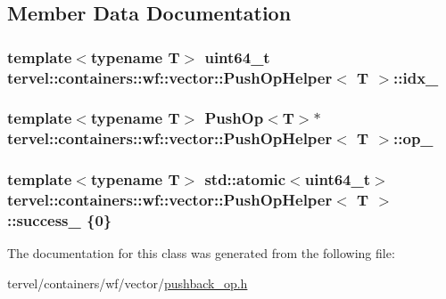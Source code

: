 \subsection{Member Data Documentation}
\hypertarget{classtervel_1_1containers_1_1wf_1_1vector_1_1_push_op_helper_a8c2d10cc9b73cbc5ccabac7e12b9f325}{}
\subsubsection[{idx\+\_\+}]{\setlength{\rightskip}{0pt plus 5cm}template$<$typename T$>$ uint64\+\_\+t {\bf tervel\+::containers\+::wf\+::vector\+::\+Push\+Op\+Helper}$<$ T $>$\+::idx\+\_\+\hspace{0.3cm}{\ttfamily [private]}}\label{classtervel_1_1containers_1_1wf_1_1vector_1_1_push_op_helper_a8c2d10cc9b73cbc5ccabac7e12b9f325}
\hypertarget{classtervel_1_1containers_1_1wf_1_1vector_1_1_push_op_helper_ac6c7fb6c7872217ddfbf83d83b426ecd}{}
\subsubsection[{op\+\_\+}]{\setlength{\rightskip}{0pt plus 5cm}template$<$typename T$>$ {\bf Push\+Op}$<$T$>$$\ast$ {\bf tervel\+::containers\+::wf\+::vector\+::\+Push\+Op\+Helper}$<$ T $>$\+::op\+\_\+\hspace{0.3cm}{\ttfamily [private]}}\label{classtervel_1_1containers_1_1wf_1_1vector_1_1_push_op_helper_ac6c7fb6c7872217ddfbf83d83b426ecd}
\hypertarget{classtervel_1_1containers_1_1wf_1_1vector_1_1_push_op_helper_ade5d081b54d4b44fc773cfb2e09035e4}{}
\subsubsection[{success\+\_\+}]{\setlength{\rightskip}{0pt plus 5cm}template$<$typename T$>$ std\+::atomic$<$uint64\+\_\+t$>$ {\bf tervel\+::containers\+::wf\+::vector\+::\+Push\+Op\+Helper}$<$ T $>$\+::success\+\_\+ \{0\}\hspace{0.3cm}{\ttfamily [private]}}\label{classtervel_1_1containers_1_1wf_1_1vector_1_1_push_op_helper_ade5d081b54d4b44fc773cfb2e09035e4}


The documentation for this class was generated from the following file\+:\begin{DoxyCompactItemize}
\item 
tervel/containers/wf/vector/\hyperlink{pushback__op_8h}{pushback\+\_\+op.\+h}\end{DoxyCompactItemize}
